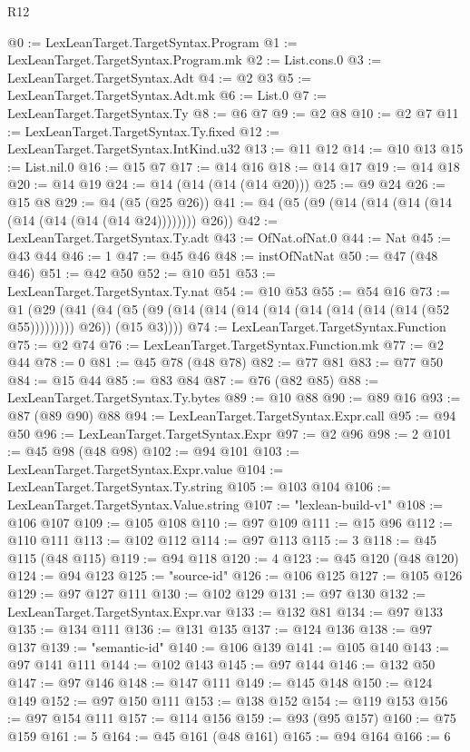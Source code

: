 \begin{lexlean}{R12}
\begin{coremodule}
{{{{{{{{{{{{{{{{{{{{{{{{{{{{{{{{{{{{{{{{{{{{{{{{{{{{{{{{{{{{{{{{{{{{{{{{{{{{{{{{{{@0 := LexLeanTarget.TargetSyntax.Program
@1 := LexLeanTarget.TargetSyntax.Program.mk
@2 := List.cons.{0}
@3 := LexLeanTarget.TargetSyntax.Adt
@4 := @2 @3
@5 := LexLeanTarget.TargetSyntax.Adt.mk
@6 := List.{0}
@7 := LexLeanTarget.TargetSyntax.Ty
@8 := @6 @7
@9 := @2 @8
@10 := @2 @7
@11 := LexLeanTarget.TargetSyntax.Ty.fixed
@12 := LexLeanTarget.TargetSyntax.IntKind.u32
@13 := @11 @12
@14 := @10 @13
@15 := List.nil.{0}
@16 := @15 @7
@17 := @14 @16
@18 := @14 @17
@19 := @14 @18
@20 := @14 @19
@24 := @14 (@14 (@14 (@14 @20)))
@25 := @9 @24
@26 := @15 @8
@29 := @4 (@5 (@25 @26))
@41 := @4 (@5 (@9 (@14 (@14 (@14 (@14 (@14 (@14 (@14 (@14 @24)))))))) @26))
@42 := LexLeanTarget.TargetSyntax.Ty.adt
@43 := OfNat.ofNat.{0}
@44 := Nat
@45 := @43 @44
@46 := 1
@47 := @45 @46
@48 := instOfNatNat
@50 := @47 (@48 @46)
@51 := @42 @50
@52 := @10 @51
@53 := LexLeanTarget.TargetSyntax.Ty.nat
@54 := @10 @53
@55 := @54 @16
@73 := @1
    (@29
      (@41 (@4 (@5 (@9 (@14 (@14 (@14 (@14 (@14 (@14 (@14 (@14 (@52 @55))))))))) @26)) (@15 @3))))
@74 := LexLeanTarget.TargetSyntax.Function
@75 := @2 @74
@76 := LexLeanTarget.TargetSyntax.Function.mk
@77 := @2 @44
@78 := 0
@81 := @45 @78 (@48 @78)
@82 := @77 @81
@83 := @77 @50
@84 := @15 @44
@85 := @83 @84
@87 := @76 (@82 @85)
@88 := LexLeanTarget.TargetSyntax.Ty.bytes
@89 := @10 @88
@90 := @89 @16
@93 := @87 (@89 @90) @88
@94 := LexLeanTarget.TargetSyntax.Expr.call
@95 := @94 @50
@96 := LexLeanTarget.TargetSyntax.Expr
@97 := @2 @96
@98 := 2
@101 := @45 @98 (@48 @98)
@102 := @94 @101
@103 := LexLeanTarget.TargetSyntax.Expr.value
@104 := LexLeanTarget.TargetSyntax.Ty.string
@105 := @103 @104
@106 := LexLeanTarget.TargetSyntax.Value.string
@107 := "lexlean-build-v1"
@108 := @106 @107
@109 := @105 @108
@110 := @97 @109
@111 := @15 @96
@112 := @110 @111
@113 := @102 @112
@114 := @97 @113
@115 := 3
@118 := @45 @115 (@48 @115)
@119 := @94 @118
@120 := 4
@123 := @45 @120 (@48 @120)
@124 := @94 @123
@125 := "source-id"
@126 := @106 @125
@127 := @105 @126
@129 := @97 @127 @111
@130 := @102 @129
@131 := @97 @130
@132 := LexLeanTarget.TargetSyntax.Expr.var
@133 := @132 @81
@134 := @97 @133
@135 := @134 @111
@136 := @131 @135
@137 := @124 @136
@138 := @97 @137
@139 := "semantic-id"
@140 := @106 @139
@141 := @105 @140
@143 := @97 @141 @111
@144 := @102 @143
@145 := @97 @144
@146 := @132 @50
@147 := @97 @146
@148 := @147 @111
@149 := @145 @148
@150 := @124 @149
@152 := @97 @150 @111
@153 := @138 @152
@154 := @119 @153
@156 := @97 @154 @111
@157 := @114 @156
@159 := @93 (@95 @157)
@160 := @75 @159
@161 := 5
@164 := @45 @161 (@48 @161)
@165 := @94 @164
@166 := 6
}}}}}}}}}}}}}}}}}}}}}}}}}}}}}}}}}}}}}}}}}}}}}}}}}}}}}}}}}}}}}}}}}}}}}}}}}}}}}}}}}}
\end{coremodule}
\end{lexlean}
